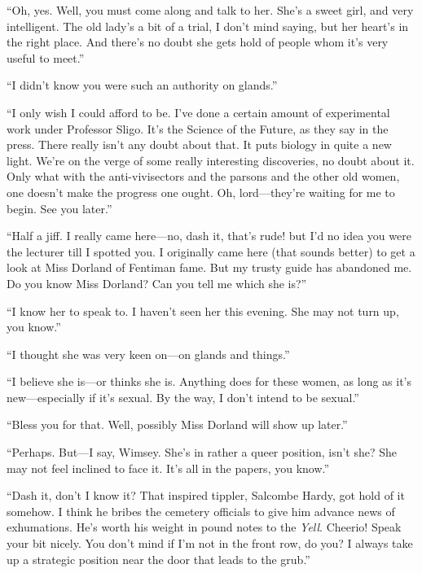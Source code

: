 \enquote{Oh, yes. Well, you must come along and talk to her. She's a sweet girl, and very intelligent. The old lady's a bit of a trial, I don't mind saying, but her heart's in the right place. And there's no doubt she gets hold of people whom it's very useful to meet.}

\enquote{I didn't know you were such an authority on glands.}

\enquote{I only wish I could afford to be. I've done a certain amount of experimental work under Professor Sligo. It's the Science of the Future, as they say in the press. There really isn't any doubt about that. It puts biology in quite a new light. We're on the verge of some really interesting discoveries, no doubt about it. Only what with the anti-vivisectors and the parsons and the other old women, one doesn't make the progress one ought. Oh, lord\allowbreak---\allowbreak they're waiting for me to begin. See you later.}

\enquote{Half a jiff. I really came here\allowbreak---\allowbreak no, dash it, that's rude! but I'd no idea you were the lecturer till I spotted you. I originally came here (that sounds better) to get a look at Miss Dorland of Fentiman fame. But my trusty guide has abandoned me. Do you know Miss Dorland? Can you tell me which she is?}

\enquote{I know her to speak to. I haven't seen her this evening. She may not turn up, you know.}

\enquote{I thought she was very keen on\allowbreak---\allowbreak on glands and things.}

\enquote{I believe she is\allowbreak---\allowbreak or thinks she is. Anything does for these women, as long as it's new\allowbreak---\allowbreak especially if it's sexual. By the way, I don't intend to be sexual.}

\enquote{Bless you for that. Well, possibly Miss Dorland will show up later.}

\enquote{Perhaps. But\allowbreak---\allowbreak I say, Wimsey. She's in rather a queer position, isn't she? She may not feel inclined to face it. It's all in the papers, you know.}

\enquote{Dash it, don't I know it? That inspired tippler, Salcombe Hardy, got hold of it somehow. I think he bribes the cemetery officials to give him advance news of exhumations. He's worth his weight in pound notes to the \textit{Yell}. Cheerio! Speak your bit nicely. You don't mind if I'm not in the front row, do you? I always take up a strategic position near the door that leads to the grub.}

